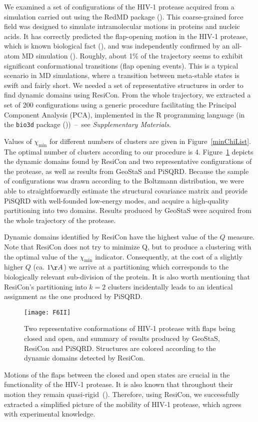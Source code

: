 We examined a set of configurations of the HIV-1 protease acquired from a simulation carried out using the RedMD package (\cite{gorecki2009redmd}).
This coarse-grained force field was designed to simulate intramolecular motions in proteins and nucleic acids.
It has correctly predicted the flap-opening motion in the HIV-1 protease, which is known biological fact (\cite{hamelberg2005fast}), and was independently confirmed by an all-atom MD simulation (\cite{sadiq2010explicit}).
Roughly, about 1\% of the trajectory seems to exhibit significant conformational transitions (flap opening events).
This is a typical scenario in MD simulations, where a transition between meta-stable states is swift and fairly short.
We needed a set of representative structures in order to find dynamic domains using ResiCon.
From the whole trajectory, we extracted a set of 200 configurations using a generic procedure facilitating the Principal Component Analysis (PCA), implemented in the R programming language (in the \texttt{bio3d} package (\cite{grant2006bio3d}))~--~see \emph{Supplementary Materials}.

Values of $\chi_\text{min}$ for different numbers of clusters are given in Figure~\ref{minChiList}.
The optimal number of clusters according to our procedure is 4.
Figure~\ref{hiv} depicts the dynamic domains found by ResiCon and two representative configurations of the protease, as well as results from GeoStaS and PiSQRD.
Because the sample of configurations was drawn according to the Boltzmann distribution, we were able to straightforwardly estimate the structural covariance matrix and provide PiSQRD with well-founded low-energy modes, and acquire a high-quality partitioning into two domains.
Results produced by GeoStaS were acquired from the whole trajectory of the protease.

Dynamic domains identified by ResiCon have the highest value of the $Q$ measure.
Note that ResiCon does not try to minimize Q, but to produce a clustering with the optimal value of the $\chi_\text{min}$ indicator.
Consequently, at the cost of a slightly higher $Q$ (ca. $1\AA$) we arrive at a partitioning which corresponds to the biologically relevant sub-division of the protein.
It is also worth mentioning that ResiCon’s partitioning into $k=2$ clusters incidentally leads to an identical assignment as the one produced by PiSQRD.

\begin{figure}
\centering
\texttt{[image: F6II]}
\caption{
Two representative conformations of HIV-1 protease with flaps being closed and open, and summary of results produced by GeoStaS, ResiCon and PiSQRD.
Structures are colored according to the dynamic domains detected by ResiCon.
}
\label{hiv}
\end{figure}
Motions of the flaps between the closed and open states are crucial in the functionality of the HIV-1 protease.
It is also known that throughout their motion they remain quasi-rigid~(\cite{freedberg2002rapid}).
Therefore, using ResiCon, we successfully extracted a simplified picture of the mobility of HIV-1 protease, which agrees with experimental knowledge.

